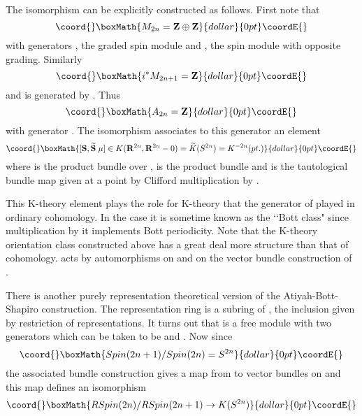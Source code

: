 \documentclass[a4paper,a4paper]{article}
\theoremstyle{conjecture}
\begin{document}
The isomorphism \myHighlight{$\alpha$}\coordHE{} can be explicitly constructed as follows. First note that  
$$\coord{}\boxMath{M_{2n}=\mathbf Z \oplus \mathbf Z}{dollar}{0pt}\coordE{}$$ 
with generators \myHighlight{$[S]=[S^+\oplus S^-]$}\coordHE{}, the \coordHE{} graded spin module and
\coordHE{}, the spin module with opposite grading. Similarly
$$\coord{}\boxMath{i^*M_{2n+1}=\mathbf Z}{dollar}{0pt}\coordE{}$$
and is generated by \myHighlight{$[S]+[\widetilde S]$}\coordHE{}.  Thus $$\coord{}\boxMath{A_{2n}=\mathbf Z}{dollar}{0pt}\coordE{}$$
with generator \myHighlight{$[S]-[\widetilde S]$}\coordHE{}.  The isomorphism \myHighlight{$\alpha$}\coordHE{} associates
to this generator an element
$$\coord{}\boxMath{[{\mathbf S}, {\mathbf {\widetilde S}}\; \mu]\in K(\mathbf R^{2n},\mathbf R^{2n}-0)=\widetilde K(S^{2n})=K^{-2n}(pt.)}{dollar}{0pt}\coordE{}$$
where \coordHE{} is the product bundle \coordHE{} over \coordHE{},
\coordHE{} is the product bundle \coordHE{} and
\myHighlight{$\mu$}\coordHE{} is the tautological bundle map given at a point \coordHE{} by Clifford
multiplication by \coordHE{}.

This K-theory element \coordHE{} plays the
role for K-theory that the generator of \coordHE{} played in ordinary cohomology. In the
case \coordHE{} it is sometime known as the \lq\lq Bott class" since multiplication by it
implements Bott periodicity.  Note that the K-theory orientation class 
constructed above has a great deal more structure than that of cohomology.  \coordHE{}
acts by automorphisms on \coordHE{} and on the vector bundle construction of
\coordHE{}.  

There is another purely representation theoretical
version of the Atiyah-Bott-Shapiro construction.  The representation ring
\coordHE{} is a subring of \coordHE{}, the inclusion given by restriction
of representations.  It turns out that \coordHE{} is a free \coordHE{} module
with two generators which can be taken to be \coordHE{} and \coordHE{}. Now since 
$$\coord{}\boxMath{ Spin(2n+1)/Spin(2n)=S^{2n}}{dollar}{0pt}\coordE{}$$
the associated bundle construction gives a map from \coordHE{} to vector bundles on \coordHE{}
and this map defines an isomorphism
$$\coord{}\boxMath{RSpin(2n)/RSpin(2n+1)\rightarrow K(S^{2n})}{dollar}{0pt}\coordE{}$$
\end{document}
